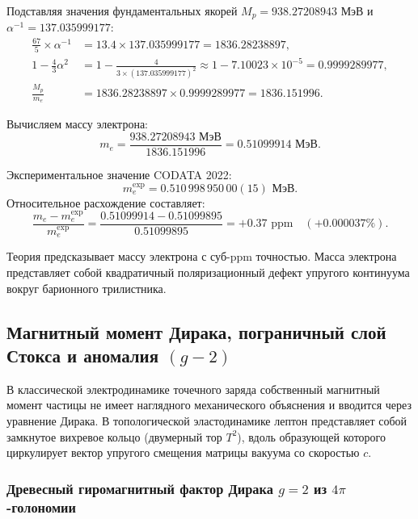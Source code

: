 \documentclass[11pt,a4paper]{article}
\theoremstyle{definition}
\theoremstyle{remark}
\begin{document}
Подставляя значения фундаментальных якорей $M_p = 938.27208943\text{ МэВ}$ и $\alpha^{-1} = 137.035999177$:
\begin{align}
	\frac{67}{5} \times \alpha^{-1} &= 13.4 \times 137.035999177 = 1836.28238897, \\
	1 - \frac{4}{3}\alpha^2 &= 1 - \frac{4}{3 \times (137.035999177)^2} \approx 1 - 7.10023 \times 10^{-5} = 0.9999289977, \\
	\frac{M_p}{m_e} &= 1836.28238897 \times 0.9999289977 = 1836.151996.
\end{align}
	
Вычисляем массу электрона:
\begin{equation}
	m_e = \frac{938.27208943\text{ МэВ}}{1836.151996} = 0.51099914\text{ МэВ}.
	\label{eq:electron_mass_numerical_result}
\end{equation}
	
	Экспериментальное значение CODATA 2022:
\begin{equation}
m_e^{\mathrm{exp}} = 0.510\,998\,950\,00(15)\text{ МэВ}.
\label{eq:electron_mass_codata_benchmark}
\end{equation}
	Относительное расхождение составляет:
\begin{equation}
	\frac{m_e - m_e^{\mathrm{exp}}}{m_e^{\mathrm{exp}}} = \frac{0.51099914 - 0.51099895}{0.51099895} = +0.37\text{ ppm} \quad (+0.000037\%).
\end{equation}
	
Теория предсказывает массу электрона с суб-ppm точностью. Масса электрона представляет собой квадратичный поляризационный дефект упругого континуума вокруг барионного трилистника.

\subsection{Магнитный момент Дирака, пограничный слой Стокса и аномалия $(g-2)$}

В классической электродинамике точечного заряда собственный магнитный момент частицы не имеет наглядного механического объяснения и вводится через уравнение Дирака. В топологической эластодинамике лептон представляет собой замкнутое вихревое кольцо (двумерный тор $T^2$), вдоль образующей которого циркулирует вектор упругого смещения матрицы вакуума со скоростью $c$.

\subsubsection{Древесный гиромагнитный фактор Дирака $g = 2$ из $4\pi$-голономии}
\end{document}
